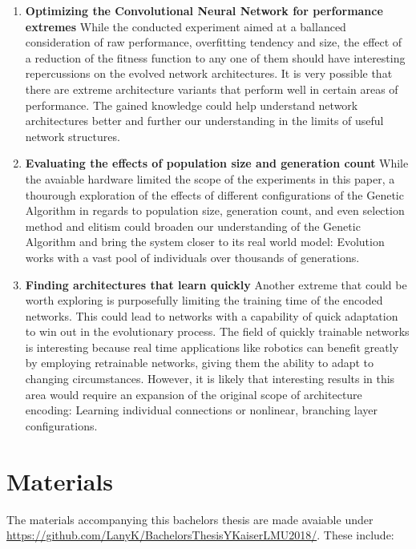 \documentclass[11pt,a4paper,twoside,openright]{scrbook}
\begin{document}
\begin{enumerate}
  \item \textbf{Optimizing the Convolutional Neural Network for performance extremes} While the conducted experiment aimed at a ballanced consideration of raw performance, overfitting tendency and size, the effect of a reduction of the fitness function to any one of them should have interesting repercussions on the evolved network architectures. It is very possible that there are extreme architecture variants that perform well in certain areas of performance. The gained knowledge could help understand network architectures better and further our understanding in the limits of useful network structures.

  \item \textbf{Evaluating the effects of population size and generation count} While the avaiable hardware limited the scope of the experiments in this paper, a thourough exploration of the effects of different configurations of the Genetic Algorithm in regards to population size, generation count, and even selection method and elitism could broaden our understanding of the Genetic Algorithm and bring the system closer to its real world model: Evolution works with a vast pool of individuals over thousands of generations.

  \item \textbf{Finding architectures that learn quickly} Another extreme that could be worth exploring is purposefully limiting the training time of the encoded networks. This could lead to networks with a capability of quick adaptation to win out in the evolutionary process. The field of quickly trainable networks is interesting because real time applications like robotics can benefit greatly by employing retrainable networks, giving them the ability to adapt to changing circumstances. However, it is likely that interesting results in this area would require an expansion of the original scope of architecture encoding: Learning individual connections or nonlinear, branching layer configurations.
\end{enumerate}

\chapter{Materials}
The materials accompanying this bachelors thesis are made avaiable under \url{https://github.com/LanyK/BachelorsThesisYKaiserLMU2018/}. These include:
\end{document}
